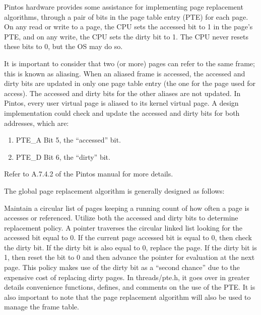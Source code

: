 \documentclass[11pt, letterpaper]{article}
\begin{document}
Pintos hardware provides some assistance for implementing page replacement algorithms, through a pair of bits in the page table entry (PTE) for each page. On any read or write to a page, the CPU sets the accessed bit to 1 in the page’s PTE, and on any write, the CPU sets the dirty bit to 1. The CPU never resets these bits to 0, but the OS may do so. 

It is important to consider that two (or more) pages can refer to the same frame; this is known as aliasing. When an aliased frame is accessed, the accessed and dirty bits are updated in only one page table entry (the one for the page used for access). The accessed and dirty bits for the other aliases are not updated. In Pintos, every user virtual page is aliased to its kernel virtual page. A design implementation could check and update the accessed and dirty bits for both addresses, which are:
\begin{enumerate}
\item PTE\_A Bit 5, the “accessed” bit.
\item PTE\_D Bit 6, the “dirty” bit. 
\end{enumerate}

Refer to A.7.4.2 of the Pintos manual for more details.

The global page replacement algorithm is generally designed as follows: 
    
Maintain a circular list of pages keeping a running count of how often a page is  accesses or referenced. Utilize both the accessed and dirty bits to determine replacement policy. A pointer traverses the circular linked list looking for the accessed bit equal to 0. If the current page accessed bit is equal to 0, then check the dirty bit. If the dirty bit is also equal to 0, replace the page. If the dirty bit is 1, then reset the bit to 0 and then advance the pointer for evaluation at the next page. This policy makes use of the dirty bit as a “second chance” due to the expensive cost of replacing dirty pages.  In threads/pte.h, it goes over in greater details convenience functions, defines, and comments on the use of the PTE.
    It is also important to note that the page replacement algorithm will also be used 
to manage the frame table.
\end{document}
